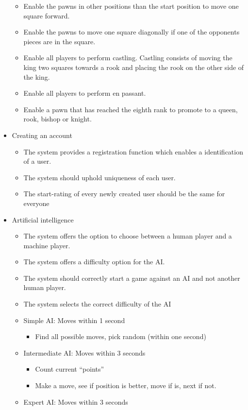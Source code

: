 \documentclass{article}
\begin{document}
\begin{flushleft}
\begin{itemize}
\begin{itemize}
		\item Enable the pawns in other positions than the start position to move one square forward.
		\item Enable the pawns to move one square diagonally if one of the opponents pieces are in the square.
		\item Enable all players to perform castling. Castling consists of moving the king two squares towards a rook and placing the rook on the other side of the king. 
		\item Enable all players to perform en passant.
		\item Enable a pawn that has reached the eighth rank to promote to a queen, rook, bishop or knight. 
	\end{itemize}
	\item Creating an account
	\begin{itemize}
		\item The system provides a registration function which enables a identification of a user.
		\item The system should uphold uniqueness of each user.
		\item The start-rating of every newly created user should be the same for everyone 
	\end{itemize}
	\item Artificial intelligence
	\begin{itemize}
	    \item The system offers the option to choose between a human player and a machine player.
		\item The system offers a difficulty option for the AI.
		\item The system should correctly start a game against an AI and not another human player.
		\item The system selects the correct difficulty of the AI
		\item Simple AI: Moves within 1 second
		\begin{itemize}
			\item Find all possible moves, pick random (within one second)
		\end{itemize}
		\item Intermediate AI: Moves within 3 seconds
		\begin{itemize}
			\item Count current “points”
			\item Make a move, see if position is better, move if is, next if not.
		\end{itemize}
		\item Expert AI: Moves within 3 seconds
	\end{itemize}
\end{itemize}


\end{flushleft}
\end{document}
